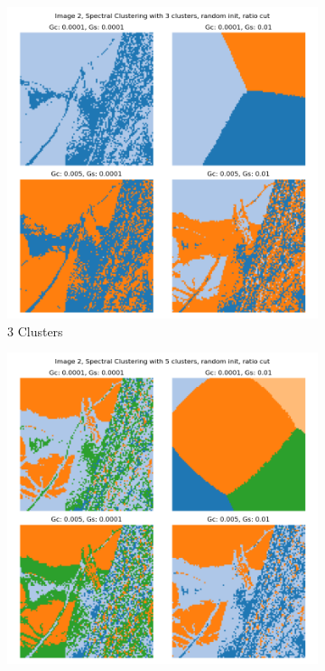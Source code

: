 \documentclass{homework}
\begin{document}
\begin{figure}[H]
    \centering
    \begin{subfigure}{0.32\textwidth}
        \centering
        \includegraphics[width=\textwidth]{output_grid/image2_sc-ratio-random-3.png}
        \caption{3 Clusters}
    \end{subfigure}
    \begin{subfigure}{0.32\textwidth}
        \centering
        \includegraphics[width=\textwidth]{output_grid/image2_sc-ratio-random-5.png}

\end{subfigure}
\end{figure}
\end{document}
